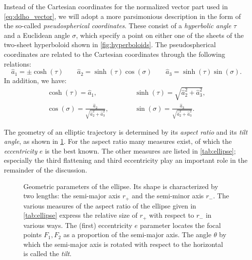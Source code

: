 Instead of the Cartesian coordinates for the normalized vector part used in \cref{eq:ddho_vector}, we will adopt a more parsimonious description in the form of the so-called \emph{pseudospherical coordinates}. These consist of a \emph{hyperbolic angle} \(\tau\)  and a Euclidean angle \(\sigma\), which specify a point on either one of the sheets of the two-sheet hyperboloid shown in \cref{fig:hyperboloids}. The pseudospherical coordinates are related to the Cartesian coordinates through the following relations:
\begin{equation}
    \hat{a}_1 = \pm\cosh(\tau) \qquad \hat{a}_2 = \sinh(\tau) \cos(\sigma) \qquad \hat{a}_3 = \sinh(\tau) \sin(\sigma).
\end{equation}
In addition, we have:
\begin{equation} 
    \begin{array}{cc}
        \displaystyle \cosh(\tau) = \hat{a}_1, \quad & \quad 
        \displaystyle \sinh(\tau) = \sqrt{\hat{a}_2^2 + \hat{a}_3^2}, \\[0.5cm]
        \displaystyle \cos(\sigma) = \frac{\hat{a}_2}{\sqrt{\hat{a}_2^2 + \hat{a}_3^2}}, \qquad & \quad
        \displaystyle \sin(\sigma) = \frac{\hat{a}_3}{\sqrt{\hat{a}_2^2 + \hat{a}_3^2}}. 
    \end{array}
    \label{eq:hyperb_coordinate_relations}
\end{equation}

The geometry of an elliptic trajectory is determined by its \emph{aspect ratio} and its \emph{tilt angle}, as shown in \cref{fig:ellipse}. For the aspect ratio many measures exist, of which the \emph{eccentricity} \(e\) is the best known. The other measures are listed in \cref{tab:ellipse}; especially the third flattening and third eccentricity play an important role in the remainder of the discussion.

\begin{figure}[ht]
    \centering
    
    \caption{Geometric parameters of the ellipse. Its shape is characterized by two lengths: the semi-major axis \(r_+\) and the semi-minor axis \(r_-\). The various measures of the aspect ratio of the ellipse given in \cref{tab:ellipse} express the relative size of \(r_+\) with respect to \(r_-\) in various ways. The (first) eccentricity \(e\) parameter locates the focal points \(F_1, F_2\) as a proportion of the semi-major axis. The angle \(\theta\) by which the semi-major axis is rotated with respect to the horizontal is called the \emph{tilt}.}
    \label{fig:ellipse}
\end{figure}

